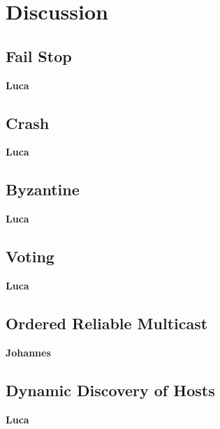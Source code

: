 \chapter{Discussion}\label{ch:Discussion}
\section{Fail Stop}\label{sec:Fail Stop}
\textbf{Luca}
\section{Crash}\label{sec:Crash}
\textbf{Luca}
\section{Byzantine}\label{sec:Byzantine}
\textbf{Luca}
\section{Voting}\label{sec:Voting}
\textbf{Luca}
\section{Ordered Reliable Multicast}\label{sec:OrderedReliableMulticast}
\textbf{Johannes}
\section{Dynamic Discovery of Hosts}\label{sec:DynamicDiscoveryofHosts}
\textbf{Luca}
